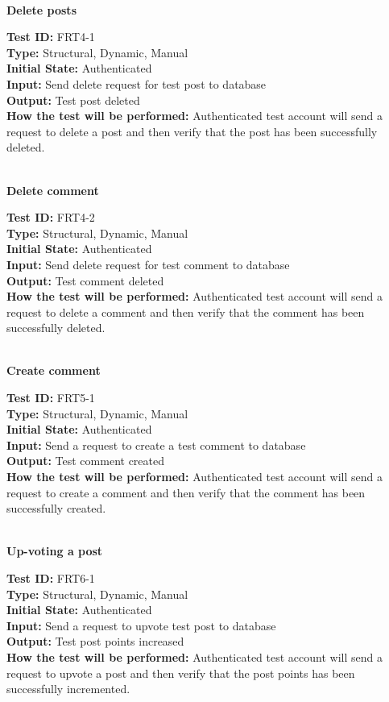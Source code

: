 \documentclass[12pt,fleqn]{article}
\begin{document}
\textbf{\\Delete posts}
\begin{tcolorbox}
\textbf{Test ID:} FRT4-1\\
\textbf{Type:} Structural, Dynamic, Manual\\
\textbf{Initial State:} Authenticated\\
\textbf{Input:} Send delete request for test post to database\\
\textbf{Output:} Test post deleted\\
\textbf{How the test will be performed:} Authenticated test account will send a request to delete a post and then verify that the post has been successfully deleted.
\end{tcolorbox}

\textbf{\\Delete comment}
\begin{tcolorbox}
\textbf{Test ID:} FRT4-2\\
\textbf{Type:} Structural, Dynamic, Manual\\
\textbf{Initial State:} Authenticated\\
\textbf{Input:} Send delete request for test comment to database\\
\textbf{Output:} Test comment deleted\\
\textbf{How the test will be performed:} Authenticated test account will send a request to delete a comment and then verify that the comment has been successfully deleted.
\end{tcolorbox}

\textbf{\\Create comment}
\begin{tcolorbox}
\textbf{Test ID:} FRT5-1\\
\textbf{Type:} Structural, Dynamic, Manual\\
\textbf{Initial State:} Authenticated\\
\textbf{Input:} Send a request to create a test comment to database\\
\textbf{Output:} Test comment created\\
\textbf{How the test will be performed:} Authenticated test account will send a request to create a comment and then verify that the comment has been successfully created.
\end{tcolorbox}

\textbf{\\Up-voting a post}
\begin{tcolorbox}
\textbf{Test ID:} FRT6-1\\
\textbf{Type:} Structural, Dynamic, Manual\\
\textbf{Initial State:} Authenticated\\
\textbf{Input:} Send a request to upvote test post to database\\
\textbf{Output:} Test post points increased\\
\textbf{How the test will be performed:} Authenticated test account will send a request to upvote a post and then verify that the post points has been successfully incremented.
\end{tcolorbox}
\end{document}
